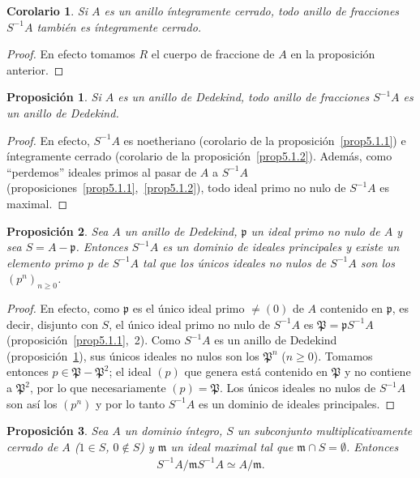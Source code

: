 \documentclass[10pt,oneside,bibtotoc,smallheadings,leqno,a5paper,DIV=12]{scrbook}
\newcommand{\idl}[1]{\mathfrak{#1}}
\numberwithin{equation}{section}
\theoremstyle{defi}
\theoremstyle{enonce}
\newtheorem{proposition}{Proposici\'on}
\newtheorem*{corollary*}{Corolario}
\theoremstyle{rem}
\numberwithin{theorem}{section}
\numberwithin{proposition}{section}
\numberwithin{definition}{section}
\numberwithin{lemma}{section}
\numberwithin{corollary}{section}
\numberwithin{example}{section}
\numberwithin{footnote}{section}%
\begin{document}
\begin{corollary*}
Si $A$ es un anillo \'integramente cerrado, todo anillo de fracciones $S^{-1}A$ tambi\'en es \'integramente
cerrado.
\end{corollary*}

\begin{proof}
En efecto tomamos $R$ el cuerpo de fraccione de $A$ en la proposici\'on anterior.
\end{proof}

\begin{proposition}\label{prop5.1.3}
Si $A$ es un anillo de Dedekind, todo anillo de fracciones $S^{-1}A$ es un anillo de Dedekind.
\end{proposition}

\begin{proof}
En efecto, $S^{-1}A$ es noetheriano (corolario de la proposici\'on~\ref{prop5.1.1})
e \'integramente cerrado (corolario de la proposici\'on~\ref{prop5.1.2}). Adem\'as,
como ``perdemos'' ideales primos al pasar de $A$ a $S^{-1}A$ (proposiciones~\ref{prop5.1.1},~\ref{prop5.1.2}), todo ideal primo no nulo de $S^{-1}A$
es maximal.
\end{proof}

\begin{proposition}\label{prop5.1.4}
Sea $A$ un anillo de Dedekind, $\idl{p}$ un ideal primo no nulo de $A$ y sea $S = A-\idl{p}$. Entonces $S^{-1}A$
es un dominio de ideales principales y existe un elemento primo $p$ de $S^{-1}A$ tal que los \'unicos
ideales no nulos de $S^{-1}A$ son los $(p^{n})_{n\geq 0}$.
\end{proposition}

\begin{proof}
En efecto, como $\idl{p}$ es el \'unico ideal primo $\neq(0)$ de $A$ contenido en $\idl{p}$, es decir, disjunto con
$S$, el \'unico ideal primo no nulo de $S^{-1}A$ es $\idl{P}=\idl{p}S^{-1}A$
(proposici\'on~\ref{prop5.1.1},~2). Como $S^{-1}A$ es un
anillo de Dedekind (proposici\'on~\ref{prop5.1.3}), sus \'unicos ideales no nulos son los $\idl{P}^{n}$ ($n\geq 0$). Tomamos entonces
$p\in\idl{P}-\idl{P}^{2}$; el ideal $(p)$ que genera est\'a contenido en $\idl{P}$ y no contiene a $\idl{P}^{2}$,
por lo que necesariamente $(p) = \idl{P}$. Los \'unicos ideales no nulos de $S^{-1}A$ son as\'i los $(p^{n})$
y por lo tanto $S^{-1}A$ es un dominio de ideales principales.
\end{proof}

\begin{proposition}\label{prop5.1.5}
Sea $A$ un dominio \'integro, $S$ un subconjunto multiplicativamente cerrado de $A$
{\upshape(}$1\in S$, $0\notin S${\upshape)} y $\idl{m}$ un ideal maximal tal que
$\idl{m}\cap S = \emptyset$. Entonces
\begin{gather*}
S^{-1}A/\idl{m}S^{-1}A\simeq A/\idl{m}.
\end{gather*}
\end{proposition}
\end{document}
